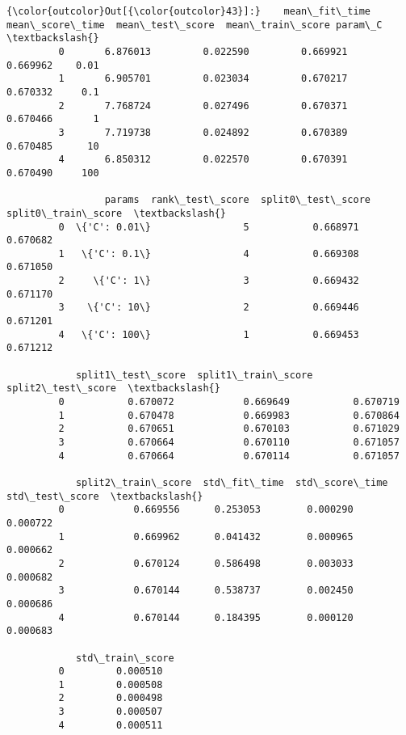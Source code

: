 \documentclass[11pt]{article}
\begin{document}
            \begin{Verbatim}[commandchars=\\\{\}]
{\color{outcolor}Out[{\color{outcolor}43}]:}    mean\_fit\_time  mean\_score\_time  mean\_test\_score  mean\_train\_score param\_C  \textbackslash{}
         0       6.876013         0.022590         0.669921          0.669962    0.01   
         1       6.905701         0.023034         0.670217          0.670332     0.1   
         2       7.768724         0.027496         0.670371          0.670466       1   
         3       7.719738         0.024892         0.670389          0.670485      10   
         4       6.850312         0.022570         0.670391          0.670490     100   
         
                 params  rank\_test\_score  split0\_test\_score  split0\_train\_score  \textbackslash{}
         0  \{'C': 0.01\}                5           0.668971            0.670682   
         1   \{'C': 0.1\}                4           0.669308            0.671050   
         2     \{'C': 1\}                3           0.669432            0.671170   
         3    \{'C': 10\}                2           0.669446            0.671201   
         4   \{'C': 100\}                1           0.669453            0.671212   
         
            split1\_test\_score  split1\_train\_score  split2\_test\_score  \textbackslash{}
         0           0.670072            0.669649           0.670719   
         1           0.670478            0.669983           0.670864   
         2           0.670651            0.670103           0.671029   
         3           0.670664            0.670110           0.671057   
         4           0.670664            0.670114           0.671057   
         
            split2\_train\_score  std\_fit\_time  std\_score\_time  std\_test\_score  \textbackslash{}
         0            0.669556      0.253053        0.000290        0.000722   
         1            0.669962      0.041432        0.000965        0.000662   
         2            0.670124      0.586498        0.003033        0.000682   
         3            0.670144      0.538737        0.002450        0.000686   
         4            0.670144      0.184395        0.000120        0.000683   
         
            std\_train\_score  
         0         0.000510  
         1         0.000508  
         2         0.000498  
         3         0.000507  
         4         0.000511  
\end{Verbatim}
        
\end{document}
